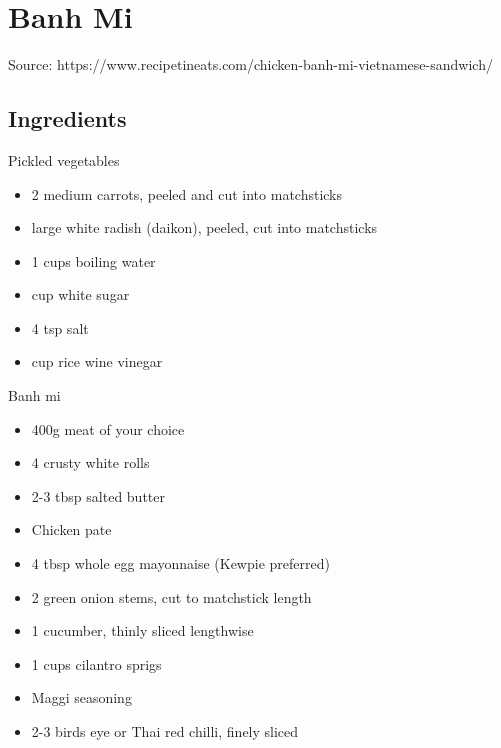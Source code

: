 \clearpage
\section{Banh Mi}


Source: https://www.recipetineats.com/chicken-banh-mi-vietnamese-sandwich/

\subsection{Ingredients}

\begin{multicols}{2}
    Pickled vegetables

    \begin{itemize}
        \item 2 medium carrots, peeled and cut into matchsticks
        \item {} large white radish (daikon), peeled, cut into matchsticks
        \item 1 cups boiling water
        \item {} cup white sugar
        \item 4 tsp salt
        \item {} cup rice wine vinegar
    \end{itemize}

    \vfill\null
    \columnbreak

    Banh mi

    \begin{itemize}
        \item 400g meat of your choice
        \item 4 crusty white rolls
        \item 2-3 tbsp salted butter
        \item Chicken pate
        \item 4 tbsp whole egg mayonnaise (Kewpie preferred)
        \item 2 green onion stems, cut to matchstick length
        \item 1 cucumber, thinly sliced lengthwise
        \item 1 cups cilantro sprigs
        \item Maggi seasoning
        \item 2-3 birds eye or Thai red chilli, finely sliced
    \end{itemize}
\end{multicols}


